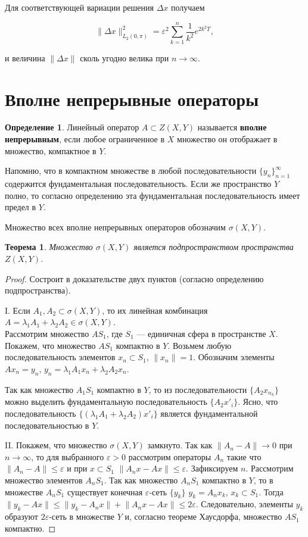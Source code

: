 \documentclass[12pt,a4paper,titlepage]{book}
\theoremstyle{definition}
\newtheorem*{definition}{Определение}
\theoremstyle{plain}
\newtheorem*{theorem}{Теорема}
\theoremstyle{remark}
\theoremstyle{remark}
\theoremstyle{remark}
\theoremstyle{plain}
\begin{document}
\begin{enumerate}
Для соответствующей вариации решения $\Delta x$ получаем
\begin{center}
$$\| \Delta x \|_{L_2(0, \pi)}^2 = \varepsilon ^2 \sum\limits_{k=1}^n \frac{1}{k^2} e^{2 k^2 T},$$
\end{center}
и величина $\| \Delta x \|$ сколь угодно велика при $n \longrightarrow \infty.$

\end{enumerate}

\section{Вполне непрерывные операторы}
\begin{definition}Линейный оператор $A \subset Z(X, Y)$ называется \textbf{вполне непрерывным}, если любое ограниченное в $X$ множество он отображает в множество, компактное в $Y$.
\end{definition}
Напомню, что в компактном множестве в любой последовательности $\lbrace y_n \rbrace_{n=1}^{\infty}$ содержится фундаментальная последовательность. Если же пространство $Y$ полно, то согласно определению эта фундаментальная последовательность имеет предел в $Y$.

Множество всех вполне непрерывных операторов обозначим $\sigma(X,Y)$.
\begin{theorem}Множество $\sigma(X,Y)$ является подпространством пространства $Z(X, Y)$.
\end{theorem}
\begin{proof}Состроит в доказательстве двух пунктов (согласно определению подпространства).

I. Если $A_1, A_2 \subset \sigma(X,Y)$, то их линейная комбинация $A=\lambda_1 A_1+\lambda_2 A_2\in \sigma(X,Y)$.\\
Рассмотрим множество $AS_1$, где $S_1$ --- единичная сфера в пространстве $X$. Покажем, что множество $AS_1$ компактно в $Y$. Возьмем любую последовательность элементов $x_n \subset S_1$, $\lVert x_n \rVert=1$. Обозначим элементы $Ax_n=y_n$, $y_n=\lambda_1 A_1 x_n+\lambda_2 A_2 x_n$.

Так как множество $A_1S_1$ компактно в $Y$, то из последовательности $\lbrace A_2x_{n_k} \rbrace$ можно выделить фундаментальную последовательность $\lbrace A_2x'_i \rbrace$. Ясно, что последовательность $\lbrace (\lambda_1 A_1+\lambda_2 A_2)x'_i \rbrace$ является фундаментальной последовательностью в $Y$.

II. Покажем, что множество $\sigma(X,Y)$ замкнуто. Так как $\lVert A_n-A \rVert \rightarrow 0$ при $n\rightarrow \infty$, то для выбранного $\varepsilon > 0$ рассмотрим операторы $A_n$ такие что $\lVert A_n-A \rVert \leq  \varepsilon$ и при $x \subset S_1$ $\lVert A_n x-Ax\rVert \leq  \varepsilon$. Зафиксируем $n$. Рассмотрим множество элементов $A_n S_1$. Так как множество $A_n S_1$ компактно в $Y$, то в множестве $A_n S_1$ существует конечная $\varepsilon$-сеть $\lbrace y_k \rbrace$ $y_k=A_n x_k$, $x_k \subset S_1$. Тогда $\lVert y_k - Ax\rVert \leq \lVert y_k - A_n x\rVert + \lVert A_n x - Ax\rVert \leq 2\varepsilon$. Следовательно, элементы $y_k$ образуют $2\varepsilon$-сеть в множестве $Y$ и, согласно теореме Хаусдорфа, множество $AS_1$ компактно.
\end{proof}
\end{document}
